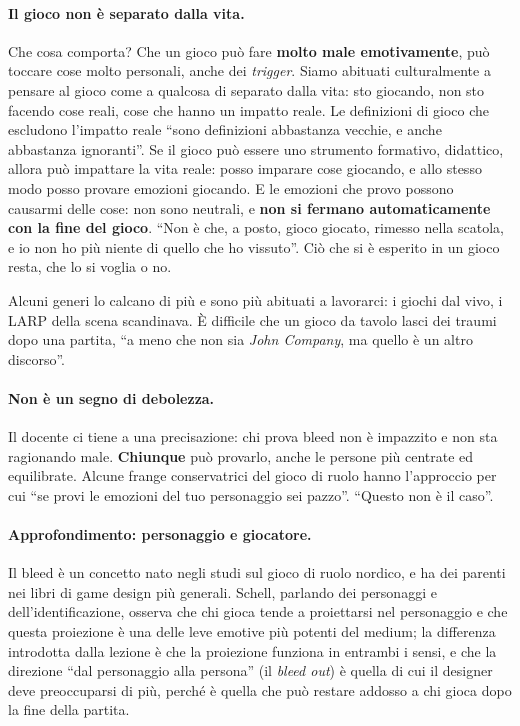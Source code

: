 \paragraph{Il gioco non è separato dalla vita.} Che cosa comporta? Che un gioco può
fare \textbf{molto male emotivamente}, può toccare cose molto personali, anche
dei \emph{trigger}. Siamo abituati culturalmente a pensare al gioco come a qualcosa
di separato dalla vita: sto giocando, non sto facendo cose reali, cose che hanno un
impatto reale. Le definizioni di gioco che escludono l'impatto reale ``sono
definizioni abbastanza vecchie, e anche abbastanza ignoranti''. Se il gioco può
essere uno strumento formativo, didattico, allora può impattare la vita reale:
posso imparare cose giocando, e allo stesso modo posso provare emozioni giocando.
E le emozioni che provo possono causarmi delle cose: non sono neutrali, e \textbf{non
si fermano automaticamente con la fine del gioco}. ``Non è che, a posto, gioco
giocato, rimesso nella scatola, e io non ho più niente di quello che ho
vissuto''. Ciò che si è esperito in un gioco resta, che lo si voglia o no.

Alcuni generi lo calcano di più e sono più abituati a lavorarci: i giochi dal vivo,
i LARP della scena scandinava. È difficile che un gioco da tavolo lasci dei
traumi dopo una partita, ``a meno che non sia \emph{John Company}, ma quello è un
altro discorso''.

\paragraph{Non è un segno di debolezza.} Il docente ci tiene a una precisazione:
chi prova bleed non è impazzito e non sta ragionando male. \textbf{Chiunque} può
provarlo, anche le persone più centrate ed equilibrate. Alcune frange conservatrici
del gioco di ruolo hanno l'approccio per cui ``se provi le emozioni del tuo
personaggio sei pazzo''. ``Questo non è il caso''.

\paragraph{Approfondimento: personaggio e giocatore.} Il bleed è un concetto nato
negli studi sul gioco di ruolo nordico, e ha dei parenti nei libri di game design
più generali. Schell, parlando dei personaggi e dell'identificazione, osserva che
chi gioca tende a proiettarsi nel personaggio e che questa proiezione è una delle
leve emotive più potenti del medium; la differenza introdotta dalla lezione è che la
proiezione funziona in entrambi i sensi, e che la direzione ``dal personaggio alla
persona'' (il \emph{bleed out}) è quella di cui il designer deve preoccuparsi di più,
perché è quella che può restare addosso a chi gioca dopo la fine della partita.

